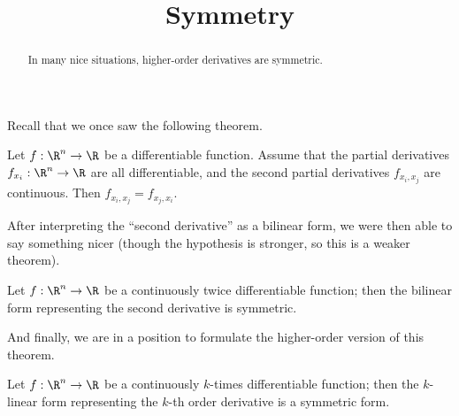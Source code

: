 \documentclass{ximera}
\title{Symmetry}
\begin{document}
\begin{abstract}
  In many nice situations, higher-order derivatives are symmetric.
\end{abstract}

Recall that we once saw the following theorem.
\begin{theorem}
  Let $f:\R^n \to \R$ be a differentiable function.  Assume that the partial derivatives $f_{x_i}:\R^n \to \R$ are all differentiable, and the second partial derivatives
  $f_{x_i,x_j}$ are continuous.  Then $f_{x_i,x_j} = f_{x_j,x_i}$.
\end{theorem}
After interpreting the ``second derivative'' as a bilinear form, we
were then able to say something nicer (though the hypothesis is
stronger, so this is a weaker theorem).
\begin{theorem}
  Let $f:\R^n \to \R$ be a continuously twice differentiable function; then the bilinear form representing the second derivative is symmetric.
\end{theorem}

And finally, we are in a position to formulate the higher-order
version of this theorem.
\begin{theorem}
  Let $f:\R^n \to \R$ be a continuously $k$-times differentiable
  function; then the $k$-linear form representing the $k$-th order
  derivative is a symmetric form.
\end{theorem}
\end{document}
